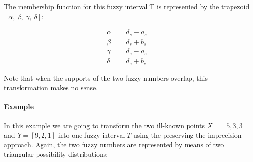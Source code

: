 \documentclass[twoside,twocolumn,a4paper]{article}
\newcommand{\Pos}{\operatorname{Pos}}
\newcommand{\Nec}{\operatorname{Nec}}
\begin{document}
The membership function for this fuzzy interval T is represented by the trapezoid $\left[\alpha,\ \beta,\ \gamma,\ \delta\right]$:

\begin{align}
\nonumber
\alpha & =  d_s - a_s \\
\nonumber
\beta & = d_s + b_s \\
\nonumber
\gamma &= d_e - a_e \\
\nonumber
\delta &= d_e + b_e 
\end{align}

Note that when the supports of the two fuzzy numbers overlap, this transformation makes no sense.



\paragraph{Example}
In this example we are going to transform the two ill-known points $X= \left[5, 3, 3 \right]$ and $Y= \left[9, 2, 1 \right]$ into one fuzzy interval $T$ using the preserving the imprecision approach. Again, the two fuzzy numbers are represented by means of two triangular possibility distributions:
\end{document}
